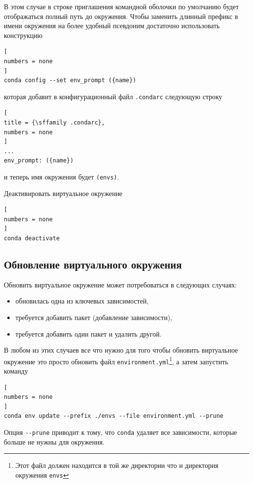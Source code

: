\documentclass[%
	11pt,
	a4paper,
	utf8,
		]{article}
\begin{document}
В этом случае в строке приглашения командной оболочки по умолчанию будет отображаться полный путь до окружения. Чтобы заменить длинный префикс в имени окружения на более удобный псевдоним достаточно использовать конструкцию

\begin{lstlisting}[
numbers = none
]
conda config --set env_prompt ({name})
\end{lstlisting}
которая добавит в конфигурационный файл \texttt{.condarc} следующую строку

\begin{lstlisting}[
title = {\sffamily .condarc},
numbers = none
]
...
env_prompt: ({name})
\end{lstlisting}
и теперь имя окружения будет \texttt{(envs)}.

Деактивировать виртуальное окружение

\begin{lstlisting}[
numbers = none
]
conda deactivate
\end{lstlisting}

\subsection{Обновление виртуального окружения}

Обновить виртуальное окружение может потребоваться в следующих случаях:

\begin{itemize}
	\item обновилась одна из ключевых зависимостей,
	
	\item требуется добавить пакет (добавление зависимости),
	
	\item требуется добавить один пакет и удалить другой.
\end{itemize}

В любом из этих случаев все что нужно для того чтобы обновить виртуальное окружение это просто обновить файл \texttt{environment.yml}\footnote{Этот файл должен находится в той же директории что и директория окружения \texttt{envs}}, а затем запустить команду

\begin{lstlisting}[
numbers = none
]
conda env update --prefix ./envs --file environment.yml --prune
\end{lstlisting}

Опция \lstinline{--prune} приводит к тому, что \texttt{conda} удаляет все зависимости, которые больше не нужны для окружения.
\end{document}
